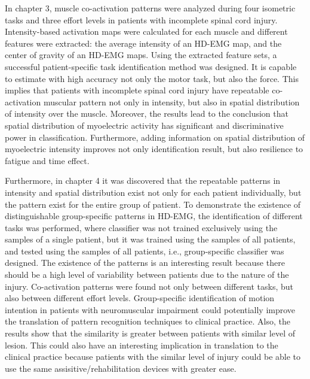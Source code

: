 In chapter 3, muscle co-activation patterns were analyzed during four isometric tasks and three effort levels in patients with incomplete spinal cord injury. Intensity-based activation maps were calculated for each muscle and different features were extracted: the average intensity of an HD-EMG map, and the center of gravity of an HD-EMG maps. Using the extracted feature sets, a successful patient-specific task identification method was designed. It is capable to estimate with high accuracy not only the motor task, but also the force. This implies that patients with incomplete spinal cord injury have repeatable co-activation muscular pattern not only in intensity, but also in spatial distribution of intensity over the muscle. Moreover, the results lead to the conclusion that spatial distribution of myoelectric activity has significant and discriminative power in classification. Furthermore, adding information on spatial distribution of myoelectric intensity improves not only identification result, but also resilience to fatigue and time effect.

Furthermore, in chapter 4 it was discovered that the repeatable patterns in intensity and spatial distribution exist not only for each patient individually, but the pattern exist for the entire group of patient. To demonstrate the existence of distinguishable group-specific patterns in HD-EMG, the identification of different tasks was performed, where classifier was not trained exclusively using the samples of a single patient, but it was trained using the samples of all patients, and tested using the samples of all patients, i.e., group-specific classifier was designed. The existence of the patterns is an interesting result because there should be a high level of variability between patients due to the nature of the injury. Co-activation patterns were found not only between different tasks, but also between different effort levels. Group-specific identification of motion intention in patients with neuromuscular impairment could potentially improve the translation of pattern recognition techniques to clinical practice. Also, the results show that the similarity is greater between patients with similar level of lesion. This could also have an interesting implication in translation to the clinical practice because patients with the similar level of injury could be able to use the same assisitive/rehabilitation devices with greater ease. 

